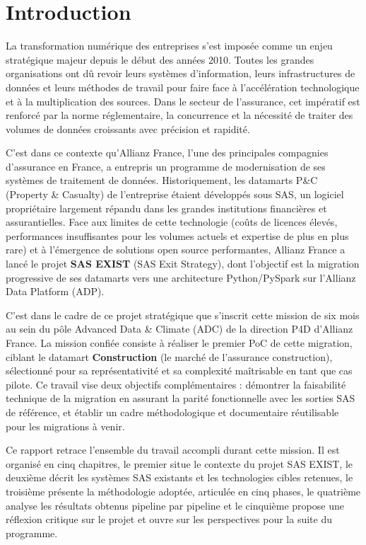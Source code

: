 \chapter*{Introduction}

La transformation numérique des entreprises s'est imposée comme un enjeu stratégique majeur depuis le début des années 2010. Toutes les grandes organisations ont dû revoir leurs systèmes d'information, leurs infrastructures de données et leurs méthodes de travail pour faire face à l'accélération technologique et à la multiplication des sources. Dans le secteur de l'assurance, cet impératif est renforcé par la norme réglementaire, la concurrence et la nécessité de traiter des volumes de données croissants avec précision et rapidité.

C'est dans ce contexte qu'Allianz France, l'une des principales compagnies d'assurance en France, a entrepris un programme de modernisation de ses systèmes de traitement de données. Historiquement, les datamarts P\&C (Property \& Casualty) de l'entreprise étaient développés sous SAS, un logiciel propriétaire largement répandu dans les grandes institutions financières et assurantielles. Face aux limites de cette technologie (coûts de licences élevés, performances insuffisantes pour les volumes actuels et expertise de plus en plus rare) et à l'émergence de solutions open source performantes, Allianz France a lancé le projet \textbf{SAS EXIST} (SAS Exit Strategy), dont l'objectif est la migration progressive de ses datamarts vers une architecture Python/PySpark sur l'Allianz Data Platform (ADP).

C'est dans le cadre de ce projet stratégique que s'inscrit cette mission de six mois au sein du pôle Advanced Data \& Climate (ADC) de la direction P4D d'Allianz France. La mission confiée consiste à réaliser le premier PoC de cette migration, ciblant le datamart \textbf{Construction} (le marché de l'assurance construction), sélectionné pour sa représentativité et sa complexité maîtrisable en tant que cas pilote. Ce travail vise deux objectifs complémentaires : démontrer la faisabilité technique de la migration en assurant la parité fonctionnelle avec les sorties SAS de référence, et établir un cadre méthodologique et documentaire réutilisable pour les migrations à venir.

Ce rapport retrace l'ensemble du travail accompli durant cette mission. Il est organisé en cinq chapitres, le premier situe le contexte du projet SAS EXIST, le deuxième décrit les systèmes SAS existants et les technologies cibles retenues, le troisième présente la méthodologie adoptée, articulée en cinq phases, le quatrième analyse les résultats obtenus pipeline par pipeline et le cinquième propose une réflexion critique sur le projet et ouvre sur les perspectives pour la suite du programme.

\cleardoublepage
